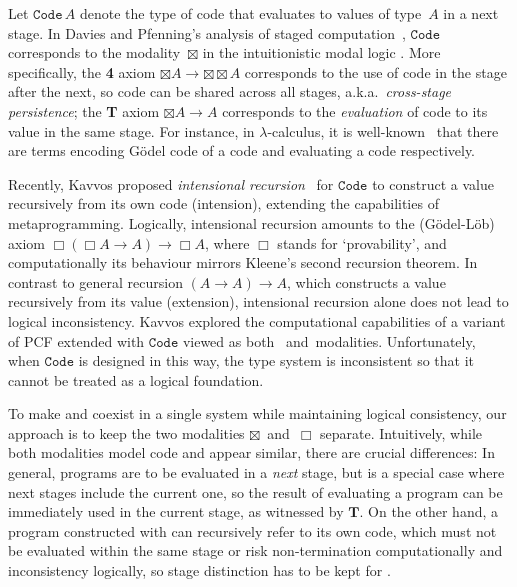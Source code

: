 \documentclass[a4paper,UKenglish,numberwithinsect,cleveref,thm-restate,draft]{lipics-v2021}
\numberwithin{equation}{section}
\theoremstyle{definition}
\theoremstyle{plain}
\begin{document}
Let $\mathtt{Code}\,A$ denote the type of code that evaluates to values of type~$A$ in a next stage.
In Davies and Pfenning's analysis of staged computation~\cite{Davies2001b}, $\mathtt{Code}$ corresponds to the modality~$\boxtimes$ in the intuitionistic modal logic \SFour.
More specifically, the \textbf{4} axiom $\boxtimes A \to {\boxtimes} {\boxtimes} A$ corresponds to the use of code in the stage after the next, so code can be shared across all stages, a.k.a.~\emph{cross-stage persistence};
the \textbf{T} axiom $\boxtimes A \to A$ corresponds to the \emph{evaluation} of code to its value in the same stage.
For instance, in $\lambda$-calculus, it is well-known~\cite{Barendregt1984a} that there are terms encoding Gödel code of a code and evaluating a code respectively.%

Recently, Kavvos proposed \emph{intensional recursion}~\cite{Kavvos2017a} for $\mathtt{Code}$ to construct a value recursively from its own code (intension), extending the capabilities of metaprogramming.
Logically, intensional recursion amounts to the \GL (Gödel-Löb) axiom $\Box (\Box A \to A) \to \Box A$, where $\Box$ stands for `provability', and computationally its behaviour mirrors Kleene's second recursion theorem.
In contrast to general recursion $(A \to A) \to A$, which constructs a value recursively from its value (extension), intensional recursion alone does not lead to logical inconsistency.
Kavvos explored the computational capabilities of a variant of PCF extended with $\mathtt{Code}$ viewed as both \SFour~and~\GL modalities.
Unfortunately, when $\mathtt{Code}$ is designed in this way, the type system is inconsistent so that it cannot be treated as a logical foundation.

To make \SFour and \GL coexist in a single system while maintaining logical consistency, our approach is to keep the two modalities $\boxtimes$~and~$\Box$ separate.
Intuitively, while both modalities model code and appear similar, there are crucial differences:
In general, programs are to be evaluated in a \emph{next} stage, but \SFour is a special case where next stages include the current one, so the result of evaluating a program can be immediately used in the current stage, as witnessed by $\mathbf{T}$.
On the other hand, a program constructed with \GL can recursively refer to its own code, which must not be evaluated within the same stage or risk non-termination computationally and inconsistency logically, so stage distinction has to be kept for \GL.
\end{document}
